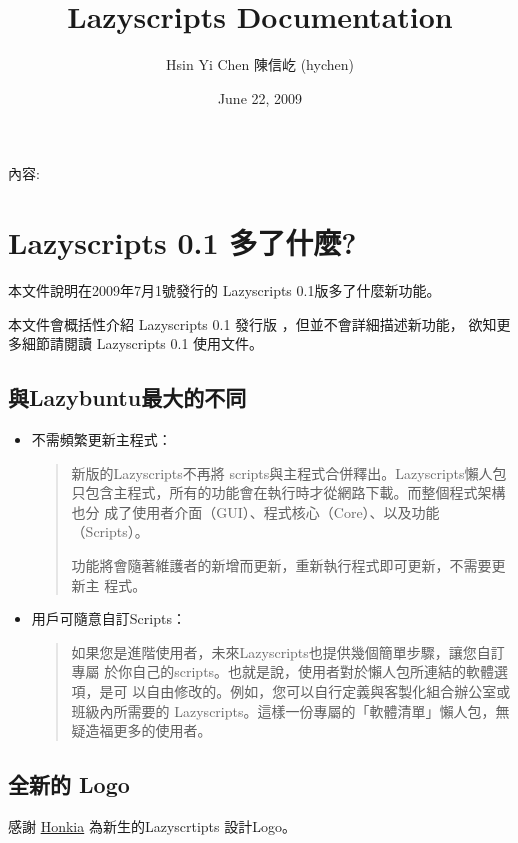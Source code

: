 \documentclass[letterpaper,10pt,english]{manual}
\title{Lazyscripts Documentation}
\date{June 22, 2009}
\author{Hsin Yi Chen 陳信屹 (hychen)}
\begin{document}
\maketitle
\tableofcontents



內容:

\resetcurrentobjects


\chapter{Lazyscripts 0.1 多了什麼?}

本文件說明在2009年7月1號發行的 Lazyscripts 0.1版多了什麼新功能。

本文件會概括性介紹 Lazyscripts 0.1 發行版 ，但並不會詳細描述新功能，
欲知更多細節請閱讀 Lazyscripts 0.1 使用文件。


\section{與Lazybuntu最大的不同}
\begin{itemize}
\item {} 
不需頻繁更新主程式：
\begin{quote}

新版的Lazyscripts不再將 scripts與主程式合併釋出。Lazyscripts懶人包
只包含主程式，所有的功能會在執行時才從網路下載。而整個程式架構也分
成了使用者介面（GUI）、程式核心（Core）、以及功能（Scripts）。

功能將會隨著維護者的新增而更新，重新執行程式即可更新，不需要更新主
程式。
\end{quote}

\item {} 
用戶可隨意自訂Scripts：
\begin{quote}

如果您是進階使用者，未來Lazyscripts也提供幾個簡單步驟，讓您自訂專屬
於你自己的scripts。也就是說，使用者對於懶人包所連結的軟體選項，是可
以自由修改的。例如，您可以自行定義與客製化組合辦公室或班級內所需要的
Lazyscripts。這樣一份專屬的「軟體清單」懶人包，無疑造福更多的使用者。
\end{quote}

\end{itemize}


\section{全新的 Logo}

感謝 \href{http://pdtw.blogspot.com/}{Honkia}
為新生的Lazyscrtipts 設計Logo。
\end{document}
